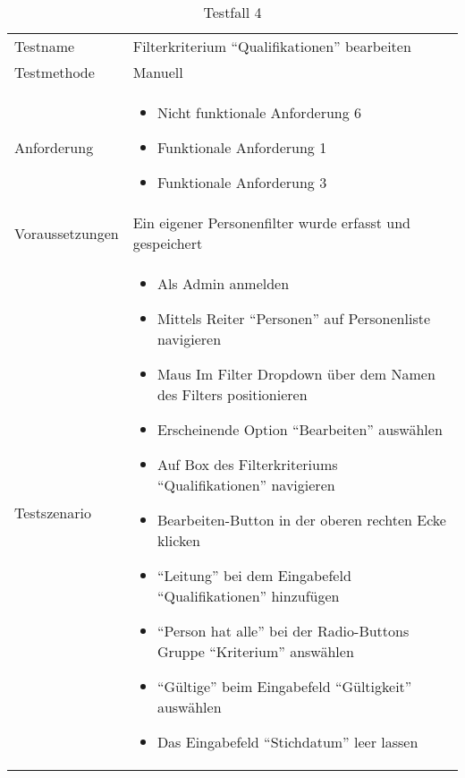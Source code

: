 \begin{table}[h!]
   \begin{tabular}{|L{0.4\textwidth}|L{0.6\textwidth}|}
       \hline
         \\[12pt]
       \hline
        Testname & Filterkriterium ``Qualifikationen'' bearbeiten \\
       \hline
       Testmethode & Manuell \\
       \hline
        Anforderung & 
        \begin{itemize}
         \item Nicht funktionale Anforderung 6
         \item Funktionale Anforderung 1
         \item Funktionale Anforderung 3
         \end{itemize}  \\
       \hline
       Voraussetzungen & Ein eigener Personenfilter wurde erfasst und gespeichert \\
       \hline
       Testszenario & 
       \begin{itemize}
         \item Als Admin anmelden
         \item Mittels Reiter ``Personen'' auf Personenliste navigieren
         \item Maus Im Filter Dropdown über dem Namen des Filters positionieren
         \item Erscheinende Option ``Bearbeiten'' auswählen
         \item Auf Box des Filterkriteriums ``Qualifikationen'' navigieren
         \item Bearbeiten-Button in der oberen rechten Ecke klicken
         \item ``Leitung'' bei dem Eingabefeld ``Qualifikationen'' hinzufügen
         \item ``Person hat alle'' bei der Radio-Buttons Gruppe ``Kriterium'' answählen
         \item ``Gültige'' beim Eingabefeld ``Gültigkeit'' auswählen
         \item Das Eingabefeld ``Stichdatum'' leer lassen
       \end{itemize} \\
       \hline
     \end{tabular}
     \caption{Testfall 4}
\end{table}

